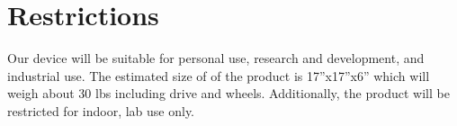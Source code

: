 \section{Restrictions}
Our device will be suitable for personal use, research and development, and industrial use. The estimated size of of the product is 17”x17”x6” which will weigh about 30 lbs including drive and wheels. Additionally, the product will be restricted for indoor, lab use only. \\
